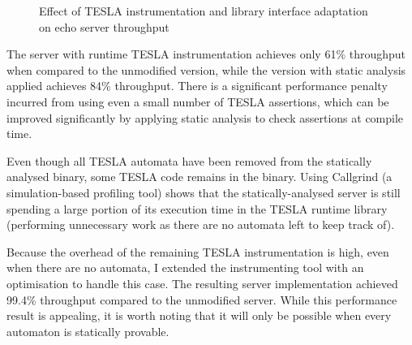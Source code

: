 \begin{figure}[ht]
  \centering
  \caption{Effect of TESLA instrumentation and library interface adaptation on
  echo server throughput}
  \label{fig:locks-bench}
\end{figure}

The server with runtime TESLA instrumentation achieves only 61\% throughput when
compared to the unmodified version, while the version with static analysis
applied achieves 84\% throughput. There is a significant performance penalty
incurred from using even a small number of TESLA assertions, which can be
improved significantly by applying static analysis to check assertions at
compile time.

Even though all TESLA automata have been removed from the statically analysed
binary, some TESLA code remains in the binary. Using Callgrind
\cite{weidendorfer_tool_2004} (a simulation-based profiling tool) shows that the
statically-analysed server is still spending a large portion of its execution
time in the TESLA runtime library (performing unnecessary work as there are no
automata left to keep track of).

Because the overhead of the remaining TESLA instrumentation is high, even when
there are no automata, I extended the instrumenting tool with an optimisation to
handle this case. The resulting server implementation achieved 99.4\% throughput
compared to the unmodified server. While this performance result is appealing,
it is worth noting that it will only be possible when every automaton is
statically provable.

